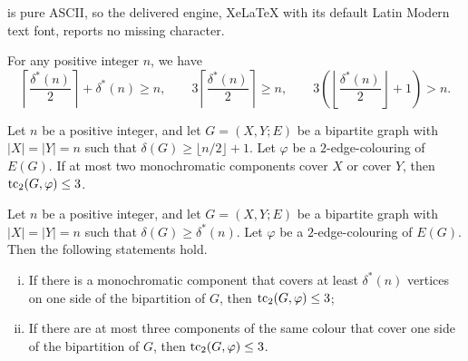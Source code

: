 \documentclass[10pt,a4paper]{amsart}
\def\tc{\mathop{\text{\rm tc}}\nolimits}
\begin{document}
is pure ASCII, so the delivered engine, XeLaTeX with its default Latin Modern text font, reports no missing character.
\begin{fact}\label{fact:simple}
For any positive integer $n$, we have 
\[
\left\lceil\frac{\delta^*(n)}{2}\right\rceil+\delta^*(n)\ge n,
\qquad
3\left\lceil\frac{\delta^*(n)}{2}\right\rceil\ge n,
\qquad
3\left(\left\lfloor\frac{\delta^*(n)}{2}\right\rfloor+1\right)>n.
\]
\end{fact}

\begin{proposition}\label{prop:5}
%
Let $n$ be a positive integer, and let $G=(X,Y;E)$ be a bipartite graph with
$|X|=|Y|=n$ such that $\delta(G)\ge \lfloor n/2\rfloor+1$. Let $\varphi$ be a
$2$-edge-colouring of $E(G)$. If at most two monochromatic components cover $X$ or
cover $Y$, then $\tc_2(G,\varphi)\le 3$.

\end{proposition}

\begin{proposition}\label{prop:7}
%
Let $n$ be a positive integer, and let $G=(X,Y;E)$ be a bipartite graph with
$|X|=|Y|=n$ such that $\delta(G)\ge\delta^*(n)$. Let $\varphi$ be a
$2$-edge-colouring of $E(G)$. Then the following statements hold.
\begin{enumerate}[(i)]
\item If there is a monochromatic component that covers at least $\delta^*(n)$
vertices on one side of the bipartition of $G$, then $\tc_2(G,\varphi) \le 3$;
\label{prop:7-item1}
\item If there are at most three components of the same colour that cover one
side of the bipartition of $G$, then $\tc_2(G,\varphi) \le 3$.\label{prop:7-item2}
\end{enumerate}
\end{proposition}
\end{document}
